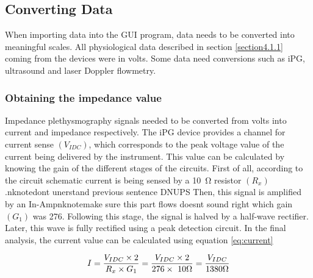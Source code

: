 \subsection{Converting Data}
\label{section4.2.1}

When importing data into the GUI program, data needs to be converted into meaningful scales. All physiological data described in section \ref{section4.1.1} coming from the devices were in volts. Some data need conversions such as iPG, ultrasound and laser Doppler flowmetry.


\subsubsection{Obtaining the impedance value}
Impedance plethysmography signals needed to be converted from volts into current and impedance respectively. The iPG device provides a channel for current sense $(V_{IDC})$, which corresponds to the peak voltage value of the current being delivered by the instrument. This value can be calculated by knowing the gain of the different stages of the circuits. First of all, according to the circuit schematic current is being sensed by a \SI{10}{\ohm} resistor $(R_x)$.nknote{dont unerstand previous sentence DNUPS} Then, this signal is amplified by an In-Ampnknote{make sure this part flows doesnt sound right} which gain $(G_1)$ was 276. Following this stage, the signal is halved by a half-wave rectifier. Later, this wave is fully rectified using a peak detection circuit. In the final analysis, the current value can be calculated using equation \ref{eq:current}

\begin{align}
	\label{eq:current}
	I = \frac{V_{IDC} \times 2}{R_x \times G_1} = \frac{V_{IDC} \times 2}{276 \times\ 10 \Omega} = \frac{V_{IDC}}{1380 \Omega} \tagaddtext{[\si{\ampere}]}
\end{align}


